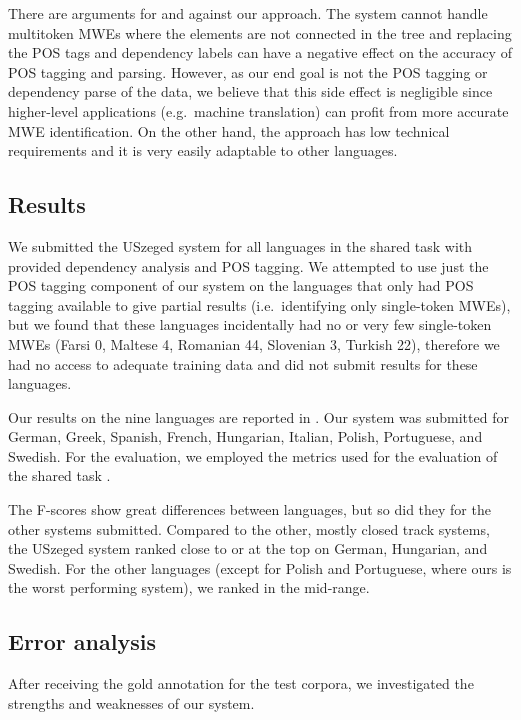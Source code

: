 \documentclass[output=paper,
modfonts,
]{langscibook}
\begin{document}
There are arguments for and against our approach. The system cannot handle multitoken MWEs where the elements are not connected in the tree and replacing the POS tags and dependency labels can have a negative effect on the accuracy of POS tagging and parsing. However, as our end goal is not the POS tagging or dependency parse of the data, we believe that this side effect is negligible since higher-level applications (e.g.~machine translation) can profit from more accurate MWE identification. On the other hand, the approach has low technical requirements and it is very easily adaptable to other languages.


\subsection{Results}

We submitted the USzeged system for all languages in the shared task with provided dependency analysis and POS tagging. We attempted to use just the POS tagging component of our system on the languages that only had POS tagging available to give partial results (i.e.~identifying only single-token MWEs), but we found that these languages incidentally had no or very few single-token MWEs (Farsi 0, Maltese 4, Romanian 44, Slovenian 3, Turkish 22), therefore we had no access to adequate training data and did not submit results for these languages.

Our results on the nine languages are reported in \citep{Simko2017}. Our system was submitted for German, Greek, Spanish, French, Hungarian, Italian, Polish, Portuguese, and Swedish. For the evaluation, we employed the metrics used for the evaluation of the shared task \cite{MWEWorkshop}.


The F-scores show great differences between languages, but so did they for the other systems submitted.
Compared to the other, mostly closed track systems, the USzeged system ranked close to or at the top on German, Hungarian, and Swedish. For the other languages (except for Polish and Portuguese, where ours is the worst performing system), we ranked in the mid-range. 

\subsection{Error analysis}

After receiving the gold annotation for the test corpora, we investigated the strengths and weaknesses of our system. 
\end{document}
